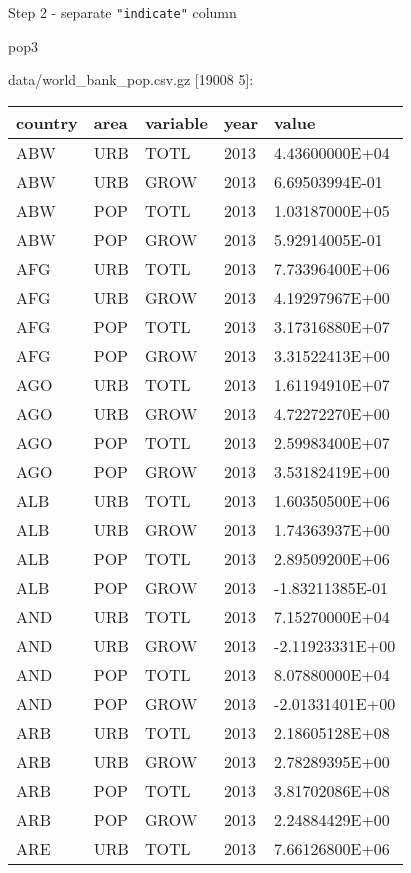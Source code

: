 \documentclass[]{article}
\newenvironment{Shaded}{\begin{snugshade}}{\end{snugshade}}
\newcommand{\BuiltInTok}[1]{#1}
\newcommand{\FunctionTok}[1]{\textcolor[rgb]{0.00,0.00,0.00}{#1}}
\newcommand{\KeywordTok}[1]{\textcolor[rgb]{0.13,0.29,0.53}{\textbf{#1}}}
\newcommand{\NormalTok}[1]{#1}
\newcommand{\SpecialStringTok}[1]{\textcolor[rgb]{0.31,0.60,0.02}{#1}}
\newcommand{\StringTok}[1]{\textcolor[rgb]{0.31,0.60,0.02}{#1}}
\newcommand{\VariableTok}[1]{\textcolor[rgb]{0.00,0.00,0.00}{#1}}
\begin{document}
Step 2 - separate \texttt{"indicate"} column

\begin{Shaded}
\end{Shaded}

\begin{Shaded}
\begin{Highlighting}[]
\NormalTok{pop3}
\end{Highlighting}
\end{Shaded}

data/world\_bank\_pop.csv.gz {[}19008 5{]}:

\begin{longtable}[]{@{}lllll@{}}
\toprule
country & area & variable & year & value\tabularnewline
\midrule
\endhead
ABW & URB & TOTL & 2013 & 4.43600000E+04\tabularnewline
ABW & URB & GROW & 2013 & 6.69503994E-01\tabularnewline
ABW & POP & TOTL & 2013 & 1.03187000E+05\tabularnewline
ABW & POP & GROW & 2013 & 5.92914005E-01\tabularnewline
AFG & URB & TOTL & 2013 & 7.73396400E+06\tabularnewline
AFG & URB & GROW & 2013 & 4.19297967E+00\tabularnewline
AFG & POP & TOTL & 2013 & 3.17316880E+07\tabularnewline
AFG & POP & GROW & 2013 & 3.31522413E+00\tabularnewline
AGO & URB & TOTL & 2013 & 1.61194910E+07\tabularnewline
AGO & URB & GROW & 2013 & 4.72272270E+00\tabularnewline
AGO & POP & TOTL & 2013 & 2.59983400E+07\tabularnewline
AGO & POP & GROW & 2013 & 3.53182419E+00\tabularnewline
ALB & URB & TOTL & 2013 & 1.60350500E+06\tabularnewline
ALB & URB & GROW & 2013 & 1.74363937E+00\tabularnewline
ALB & POP & TOTL & 2013 & 2.89509200E+06\tabularnewline
ALB & POP & GROW & 2013 & -1.83211385E-01\tabularnewline
AND & URB & TOTL & 2013 & 7.15270000E+04\tabularnewline
AND & URB & GROW & 2013 & -2.11923331E+00\tabularnewline
AND & POP & TOTL & 2013 & 8.07880000E+04\tabularnewline
AND & POP & GROW & 2013 & -2.01331401E+00\tabularnewline
ARB & URB & TOTL & 2013 & 2.18605128E+08\tabularnewline
ARB & URB & GROW & 2013 & 2.78289395E+00\tabularnewline
ARB & POP & TOTL & 2013 & 3.81702086E+08\tabularnewline
ARB & POP & GROW & 2013 & 2.24884429E+00\tabularnewline
ARE & URB & TOTL & 2013 & 7.66126800E+06\tabularnewline
\bottomrule
\end{longtable}
\end{document}
